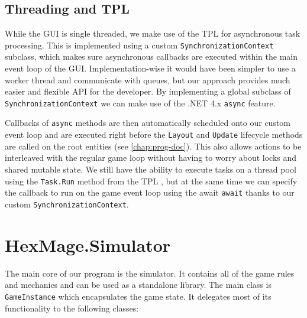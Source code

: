 \subsection{Threading and TPL}
\label{threading-tpl}

While the GUI is single threaded, we make use of the TPL for asynchronous task processing. This is implemented using a custom \verb|SynchronizationContext| subclass, which makes sure asynchronous callbacks are executed within the main event loop of the GUI. Implementation-wise it would have been simpler to use a worker thread and communicate with queues, but our approach provides much easier and flexible API for the developer. By implementing a global subclass of \verb|SynchronizationContext| we can make use of the .NET 4.x \verb|async| \citep{async} feature. 

Callbacks of \verb|async| methods are then automatically scheduled onto our custom event loop and are executed right before the \verb|Layout| and \verb|Update| lifecycle methods are called on the root entities (see \autoref{chap:prog-doc}). This also allows actions to be interleaved with the regular game loop without having to worry about locks and shared mutable state. We still have the ability to execute tasks on a thread pool using the \verb|Task.Run| method from the TPL \citep{tpl}, but at the same time we can specify the callback to run on the game event loop using the await \verb|await| thanks to our custom \verb|SynchronizationContext|.

\section{HexMage.Simulator}
\label{sec:simulator}

The main core of our program is the simulator. It contains all of the game rules and mechanics and can be used as a standalone library. The main class is \verb|GameInstance| which encapsulates the game state. It delegates most of its functionality to the following classes:

